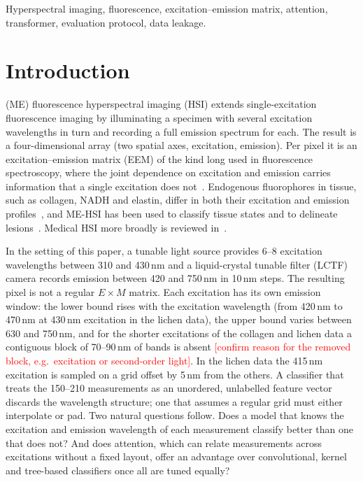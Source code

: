 \documentclass[journal]{IEEEtran}
\newcommand{\RESULT}[1]{\textcolor{red}{[#1]}}
\begin{document}
\begin{IEEEkeywords}
Hyperspectral imaging, fluorescence, excitation--emission matrix, attention, transformer, evaluation protocol, data leakage.
\end{IEEEkeywords}

\section{Introduction}
 (ME) fluorescence hyperspectral imaging (HSI) extends single-excitation fluorescence imaging by illuminating a specimen with several excitation wavelengths in turn and recording a full emission spectrum for each. The result is a four-dimensional array (two spatial axes, excitation, emission). Per pixel it is an excitation--emission matrix (EEM) of the kind long used in fluorescence spectroscopy, where the joint dependence on excitation and emission carries information that a single excitation does not~\cite{murphy2013parafac,bro1997parafac}. Endogenous fluorophores in tissue, such as collagen, NADH and elastin, differ in both their excitation and emission profiles~\cite{croce2014autofluorescence,monici2005autofluorescence}, and ME-HSI has been used to classify tissue states and to delineate lesions~\cite{gabrielyan2025access,hunanyan2025atrial,terpetrosyan2025configs}. Medical HSI more broadly is reviewed in~\cite{lu2014medical}.

In the setting of this paper, a tunable light source provides 6--8 excitation wavelengths between 310 and 430\,nm and a liquid-crystal tunable filter (LCTF) camera records emission between 420 and 750\,nm in 10\,nm steps. The resulting pixel is not a regular $E\times M$ matrix. Each excitation has its own emission window: the lower bound rises with the excitation wavelength (from 420\,nm to 470\,nm at 430\,nm excitation in the lichen data), the upper bound varies between 630 and 750\,nm, and for the shorter excitations of the collagen and lichen data a contiguous block of 70--90\,nm of bands is absent \RESULT{confirm reason for the removed block, e.g.\ excitation or second-order light}. In the lichen data the 415\,nm excitation is sampled on a grid offset by 5\,nm from the others. A classifier that treats the 150--210 measurements as an unordered, unlabelled feature vector discards the wavelength structure; one that assumes a regular grid must either interpolate or pad. Two natural questions follow. Does a model that knows the excitation and emission wavelength of each measurement classify better than one that does not? And does attention, which can relate measurements across excitations without a fixed layout, offer an advantage over convolutional, kernel and tree-based classifiers once all are tuned equally?
\end{document}
